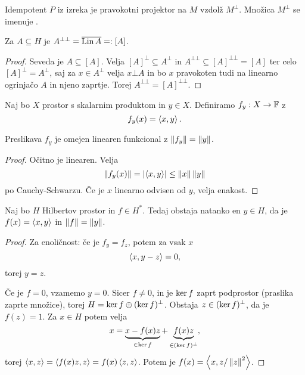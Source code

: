 Idempotent $P$ iz izreka je pravokotni projektor na $M$ vzdolž $M^\bot$.
Množica $M^\bot$ se imenuje .

\begin{posledica}
  Za $A \subseteq H$ je $A^{\bot \bot} = \overline{\operatorname{Lin} A} =: [A]$.
\end{posledica}

\begin{proof}
  Seveda je $A \subseteq [A]$.
  Velja $[A]^\bot \subseteq A^\bot$ in $A^{\bot \bot} \subseteq [A]^{\bot \bot}
  = [A]$ ter celo $[A]^\bot = A^\bot$, saj za $x \in A^\bot$ velja $x \bot A$
  in bo $x$ pravokoten tudi na linearno ogrinjačo $A$ in njeno zaprtje.
  Torej $A^{\bot \bot} = [A]^{\bot \bot}$.
\end{proof}

Naj bo $X$ prostor s skalarnim produktom in $y \in X$.
Definiramo $f_y: X \to \mathbb{F}$ z
\[
  f_y(x) = \left< x,y \right>.
\]

\begin{lema}
  Preslikava $f_y$ je omejen linearen funkcional z $\left\lVert f_y\right\rVert = \left\lVert y\right\rVert$.
\end{lema}

\begin{proof}
  Očitno je linearen.
  Velja
  \[
	\left\lVert f_y(x)\right\rVert = \left| \left< x,y \right> \right| \le \left\lVert x\right\rVert \left\lVert y\right\rVert
  \]
  po Cauchy-Schwarzu.
  Če je $x$ linearno odvisen od $y$, velja enakost.
\end{proof}

\begin{izrek}[Riesz]
  Naj bo $H$ Hilbertov prostor in $f \in H^*$.
  Tedaj obstaja natanko en $y \in H$, da je $f(x) =\left< x,y \right>$ in $\left\lVert f\right\rVert =
  \left\lVert y\right\rVert$.
\end{izrek}

\begin{proof}
  Za enoličnost: če je $f_y = f_z$, potem za vsak $x$
  \[
	\left< x, y-z \right> = 0,
  \]
  torej $y = z$.

  Če je $f = 0$, vzamemo $y = 0$.
  Sicer $f \ne 0$, in je $\operatorname{ker} f$ zaprt podprostor (praslika zaprte množice),
  torej $H = \operatorname{ker} f \oplus (\operatorname{ker} f)^\bot$.
  Obstaja $z \in (\operatorname{ker} f)^\bot$, da je $f(z) = 1$.
  Za $x \in H$ potem velja
  \[
	x = \underbrace{x - f(x) z}_{\in \operatorname{ker} f} + \underbrace{f(x) z}_{\in
	  (\operatorname{ker} f)^\bot},
  \]
  torej $\left< x,z \right> = \left< f(x) z, z \right> = f(x) \left< z,z \right>$.
  Potem je $f(x) = \left< x, z / \left\lVert z\right\rVert^2 \right>$.
\end{proof}

